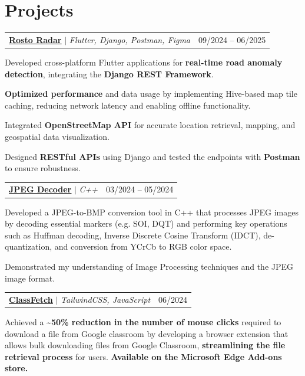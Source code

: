 \documentclass[a4paper, 11pt]{article}
\makeatletter
\newcommand{\resumeProjectHeading}[2]{
  \item
  \begin{tabular*}{1.0\textwidth}[t]{l@{\extracolsep{\fill}}r}
    #1 & #2
  \end{tabular*}
}
\makeatother
\begin{document}
\section{Projects}
\begin{outerlist}
    \resumeProjectHeading
      {\textbf{\href{https://github.com/QuickAxe/RADCM}{\underline{Rosto Radar}}} $|$ \emph{Flutter, Django, Postman, Figma}}{09/2024 -- 06/2025}        
    \begin{innerlist}
      \item Developed cross-platform Flutter applications for \textbf{real-time road anomaly detection}, integrating the \textbf{Django REST Framework}.
      \item \textbf{Optimized performance} and data usage by implementing Hive-based map tile caching, reducing network latency and enabling offline functionality.
      \item Integrated \textbf{OpenStreetMap API} for accurate location retrieval, mapping, and geospatial data visualization.
      \item Designed \textbf{RESTful APIs} using Django and tested the endpoints with \textbf{Postman} to ensure robustness.
    \end{innerlist} 

    \resumeProjectHeading
      {\textbf{\href{https://github.com/DeeptejD/JPEG-Decoder/tree/v1}{\underline{JPEG Decoder}}} $|$ \emph{C++}}{03/2024 -- 05/2024}
    \begin{innerlist}
      \item Developed a JPEG-to-BMP conversion tool in C++ that processes JPEG images by decoding essential markers (e.g. SOI, DQT) and performing key operations such as Huffman decoding, Inverse Discrete Cosine Transform (IDCT), de-quantization, and conversion from YCrCb to RGB color space.
      \item Demonstrated my understanding of Image Processing techniques and the JPEG image format.
    \end{innerlist}

    \resumeProjectHeading
      {\textbf{\href{https://github.com/DeeptejD/ClassFetch}{\underline{ClassFetch}}} $|$ \emph{TailwindCSS, JavaScript}}{06/2024}        
    \begin{innerlist}
      \item Achieved a \textbf{\textasciitilde50\% reduction in the number of mouse clicks} required to download a file from Google classroom by developing a browser extension that allows bulk downloading files from Google Classroom, \textbf{streamlining the file retrieval process} for users. \textbf{Available on the Microsoft Edge Add-ons store.}
    \end{innerlist}


\end{outerlist}
\end{document}
